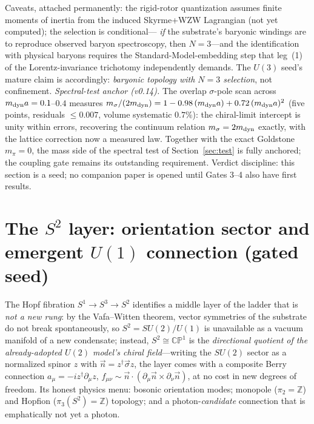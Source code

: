 \documentclass[11pt,a4paper]{article}
\begin{document}
Caveats, attached permanently: the rigid-rotor quantization
assumes finite moments of inertia from the induced Skyrme+WZW
Lagrangian (not yet computed); the selection is conditional---%
\emph{if} the substrate's baryonic windings are to reproduce
observed baryon spectroscopy, then $N = 3$---and the
identification with physical baryons requires the
Standard-Model-embedding step that leg~(1) of the
Lorentz-invariance trichotomy independently demands.
The $U(3)$ seed's mature claim is accordingly: \emph{baryonic
topology with $N = 3$ selection}, not confinement.
\emph{Spectral-test anchor (v0.14).}  The overlap $\sigma$-pole
scan across $m_{\rm dyn} a = 0.1$--$0.4$ measures
$m_\sigma/(2m_{\rm dyn}) = 1 - 0.98\,(m_{\rm dyn}a)
+ 0.72\,(m_{\rm dyn}a)^2$ (five points, residuals
$\leq 0.007$, volume systematic $0.7\%$): the chiral-limit
intercept is unity within errors, recovering the continuum
relation $m_\sigma = 2m_{\rm dyn}$ exactly, with the lattice
correction now a measured law.  Together with the exact Goldstone
$m_\pi = 0$, the mass side of the spectral test of
Section~\ref{sec:test} is fully anchored; the coupling gate
remains its outstanding requirement.
Verdict discipline: this section is a seed; no companion paper is
opened until Gates 3--4 also have first results.


\section{The $S^2$ layer: orientation sector and emergent
$U(1)$ connection (gated seed)}
\label{sec:s2seed}

The Hopf fibration $S^1 \to S^3 \to S^2$ identifies a middle layer
of the ladder that is \emph{not a new rung}: by the Vafa--Witten
theorem, vector symmetries of the substrate do not break
spontaneously, so $S^2 = SU(2)/U(1)$ is unavailable as a vacuum
manifold of a new condensate; instead, $S^2 \cong \mathbb{CP}^1$
is the \emph{directional quotient of the already-adopted $U(2)$
model's chiral field}---writing the $SU(2)$ sector as a normalized
spinor $z$ with $\vec n = z^\dagger\vec\sigma z$, the layer comes
with a composite Berry connection
$a_\mu = -i z^\dagger\partial_\mu z$,
$f_{\mu\nu} \sim \vec n\cdot(\partial_\mu\vec n\times
\partial_\nu\vec n)$, at no cost in new degrees of freedom.
Its honest physics menu: bosonic orientation modes; monopole
($\pi_2 = \mathbb{Z}$) and Hopfion ($\pi_3(S^2) = \mathbb{Z}$)
topology; and a photon-\emph{candidate} connection that is
emphatically not yet a photon.
\end{document}
